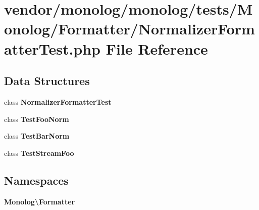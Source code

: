 \section{vendor/monolog/monolog/tests/\+Monolog/\+Formatter/\+Normalizer\+Formatter\+Test.php File Reference}
\label{_normalizer_formatter_test_8php}
\subsection*{Data Structures}
\begin{DoxyCompactItemize}
\item 
class {\bf Normalizer\+Formatter\+Test}
\item 
class {\bf Test\+Foo\+Norm}
\item 
class {\bf Test\+Bar\+Norm}
\item 
class {\bf Test\+Stream\+Foo}
\end{DoxyCompactItemize}
\subsection*{Namespaces}
\begin{DoxyCompactItemize}
\item 
 {\bf Monolog\textbackslash{}\+Formatter}
\end{DoxyCompactItemize}
